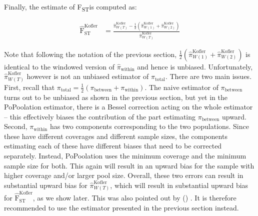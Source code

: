\documentclass[a4paper,fontsize=9pt,DIV=14]{scrartcl}
\newcommand\citeay[1]{\citeauthor{#1} (\citeyear{#1}) \cite{#1}}
\newcommand{\fst}{F\textsubscript{ST}}
\begin{document}
Finally, the estimate of \fst is computed as:

\begin{align}
    \label{eq:PoPoolation2FstEst}
    \widehat{\text{F}}_\text{ST}^\text{Kofler} &= \frac{ \widehat{\pi}_{W(T)}^\text{Kofler} - \frac{1}{2} \left(     \widehat{\pi}_{W(1)}^\text{Kofler} +     \widehat{\pi}_{W(2)}^\text{Kofler}  \right)}{ \widehat{\pi}_{W(T)}^\text{Kofler}}
\end{align}

Note that following the notation of the previous section, $\frac{1}{2}\left(\widehat{\pi}_{W(1)}^\text{Kofler} + \widehat{\pi}_{W(2)}^\text{Kofler}\right)$ is identical to the windowed version of $\widehat{\pi}_\text{within}$ and hence is unbiased.  Unfortunately, $\widehat{\pi}_{W(T)}^\text{Kofler}$ however is not an unbiased estimator of $\pi_\text{total}$.  There are two main issues.  First, recall that $\pi_\text{total} = \frac{1}{2}\left(\pi_\text{between}  + \pi_\text{within} \right)$.  The naive estimator of $\pi_\text{between}$ turns out to be unbiased as shown in the previous section, but yet in the PoPoolation estimator, there is a Bessel correction acting on the whole estimator -- this effectively biases the contribution of the part estimating $\pi_\text{between}$ upward.  Second, $\pi_\text{within}$ has two components corresponding to the two populations.  Since these have different coverages and different sample sizes, the components estimating each of these have different biases that need to be corrected separately.  Instead, PoPoolation uses the minimum coverage and the minimum sample size for both.  This again will result in an upward bias for the sample with higher coverage and/or larger pool size.  Overall, these two errors can result in substantial upward bias for $\widehat{\pi}_{W(T)}^\text{Kofler}$, which will result in substantial upward bias for $\widehat{\text{F}}_\text{ST}^\text{Kofler}$, as we show later.  This was also pointed out by \citeay{Hivert2018}. It is therefore recommended to use the estimator presented in the previous section instead.


\end{document}
